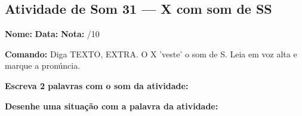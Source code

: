 \subsection{Atividade de Som 31 --- X com som de SS}
\begin{exercicio}



\noindent\textbf{Nome:} \underline{\hspace{3.2cm}} \quad \textbf{Data:} \underline{\hspace{1.6cm}} \quad \textbf{Nota:} \underline{\hspace{0.9cm}}/10


\noindent\textbf{Comando:} Diga TEXTO, EXTRA. O X 'veste' o som de S. Leia em voz alta e marque a pronúncia.


\begin{center}
\end{center}

\noindent\textbf{Escreva 2 palavras com o som da atividade:}

\begin{center}
  \underline{\hspace{3cm}} \quad \underline{\hspace{3cm}}
\end{center}

\noindent\textbf{Desenhe uma situação com a palavra da atividade:}

\begin{center}
\end{center}

\end{exercicio}



